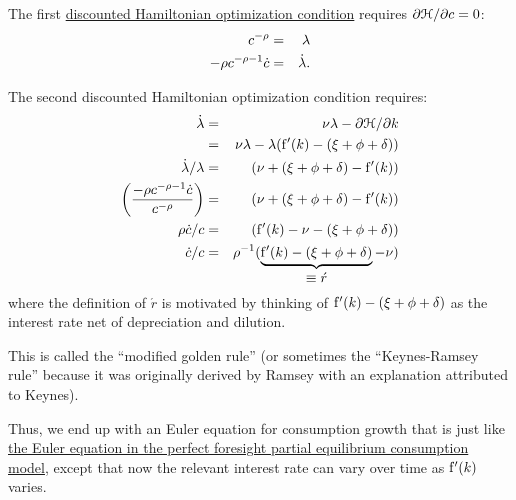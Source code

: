 \documentclass{handout}
\begin{document}
The first \href{https://en.wikipedia.org/wiki/Hamiltonian_(control_theory)}{discounted Hamiltonian optimization condition} requires $\partial 
\mathcal{H}/\partial c = 0$:
\begin{eqnarray}
        c^{-\rho} & = & \lambda  \label{eq:H1A} \\
        -\rho c^{-\rho-1}\dot{c} & = & \dot{\lambda} 
.
\end{eqnarray}

The second discounted Hamiltonian optimization condition requires:
\begin{eqnarray}
        \dot{\lambda} & = & \nu\lambda - \partial \mathcal{H}/\partial {k}  \\
         & = & \nu\lambda - \lambda (\mathrm{f}^{\prime}({k}) - (\xi+\phi+\delta))  \\
        \dot{\lambda}/{\lambda} & = & (\nu+(\xi+\phi+\delta)-\mathrm{f}^{\prime}({k}))
\\  \left(\frac{-\rho c^{-\rho-1}\dot{c}}{c^{-\rho}}\right) & = & (\nu+(\xi+\phi+\delta)-\mathrm{f}^{\prime}({k}))
\\  \rho \dot{c}/c & = & (\mathrm{f}^{\prime}({k})-\nu-(\xi+\phi+\delta))
\\  \dot{c}/c  & = & \rho^{-1}(\underbrace{\mathrm{f}^{\prime}({k})-(\xi+\phi+\delta)}_{\mbox{$\equiv \acute{r}$}}-\nu)
\end{eqnarray}
where the definition of $\acute{r}$ is motivated by thinking of 
$\mathrm{f}^{\prime}({k})-(\xi+\phi+\delta)$ as the interest rate net of depreciation and
dilution.  

This is called the ``modified golden rule'' (or sometimes the 
``Keynes-Ramsey rule'' because it was originally derived by 
Ramsey with an explanation attributed to Keynes).  

Thus, we end up with an Euler equation for consumption growth that is
just like \href{http://www.econ2.jhu.edu/people/ccarroll/public/LectureNotes/Consumption/PerfForesightCRRA/#EulerCGroFac}{the Euler equation in the perfect foresight partial equilibrium consumption model}, except that now the relevant interest rate can vary over
time as $\mathrm{f}^{\prime}({k})$ varies.
\end{document}
